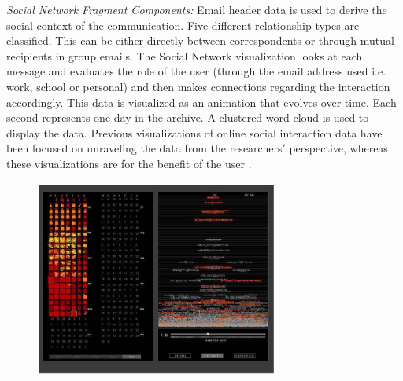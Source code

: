 \documentclass{egpubl}
\begin{document}
\textit{Social Network Fragment Components:}
Email header data is used to derive the social context of the communication.
Five different relationship types are classified. This can be either directly between correspondents or through mutual recipients in group emails.
The Social Network visualization looks at each message and evaluates the role of the user (through the email address used i.e. work, school or personal) and then makes connections regarding the interaction accordingly. 
This data is visualized as an animation that evolves over time. Each second represents one day in the archive. A clustered word cloud is used to display the data.
Previous visualizations of online social interaction data have been focused on unraveling the data from the researchers$'$ perspective, whereas these visualizations are for the benefit of the user \cite{boyd2002,donath1995}.
\begin{figure}
\begingroup
\centering
\includegraphics[width=8cm]{./images/viegas2004}
\label{fig:viegas2004}
\endgroup
\end{figure}
\end{document}

